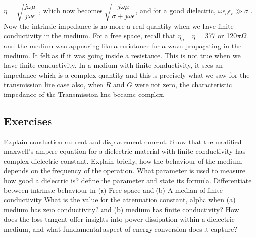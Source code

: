 $\eta= \sqrt{\dfrac{j\omega\mu}{j\omega\epsilon}}$ , which now becomes $\sqrt{\dfrac{j\omega\mu}{\sigma + j\omega\epsilon}}$, and for a good dielectric, $\omega\epsilon_{o}\epsilon_{r} \gg \sigma$ . Now the intrinsic impedance is no more a real quantity when we have finite conductivity in the medium. For a free space, recall that $\eta_{o}$= $\eta$ = 377 or 120$\pi\Omega$ and the medium was appearing like a resistance for a wave propagating in the medium. It felt as if it was going inside a resistance. This is not true when we have finite conductivity. In a medium with finite conductivity, it sees an impedance which is a complex quantity and this is precisely what we saw for the transmission line case also, when $R$ and $G$ were not zero, the characteristic impedance of the Transmission line became complex.

\begin{mdframed}[backgroundcolor=lightblue, linewidth=1pt,hidealllines=true]
\section*{Exercises}
\begin{ExerciseList}
\Exercise[label={ex251}] 
Explain conduction current and displacement current.
\Exercise[label={ex252}] 
Show that the modified maxwell’s ampere equation for a dielectric material with finite conductivity has complex dielectric constant. 
\Exercise[label={ex253}] 
Explain briefly, how the behaviour of the medium depends on the frequency of the operation.
\Exercise[label={ex254}]
What parameter is used to measure how good a dielectric is? define the parameter and state its formula.
\Exercise[label={ex255}] 
Differentiate between intrinsic behaviour in (a) Free space and (b) A median of finite conductivity
\Exercise[label={ex256}] 
What is the value for the attenuation constant, alpha when (a) medium has zero conductivity? and (b) medium has finite conductivity?
\Exercise[label={ex257}] 
How does the loss tangent offer insights into power dissipation within a dielectric medium, and what fundamental aspect of energy conversion does it capture?
\end{ExerciseList}
\end{mdframed}
